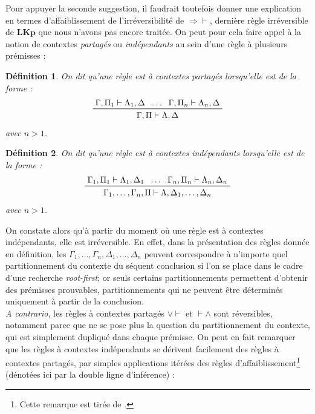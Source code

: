 \documentclass[11pt]{report}
\newcommand{\lto}{\Rightarrow}
\newcommand{\seq}{\vdash}
\newcommand{\irule}[1]{\footnotesize$#1$}
\newcommand{\iruleL}[1]{\irule{{#1}\seq}}
\newcommand{\iruleR}[1]{\irule{\seq{#1}}}
\newtheorem{definition}{Définition}
\begin{document}
Pour appuyer la seconde suggestion, il faudrait toutefois donner une explication en termes d'affaiblissement de l'irréversibilité de {\iruleL{\lto}}, dernière règle irréversible de $\mathbf{LKp}$ que nous n'avons pas encore traitée. On peut pour cela faire appel à la notion de contextes \emph{partagés} ou \emph{indépendants} au sein d'une règle à plusieurs prémisses :

\begin{definition}
    On dit qu'une règle est \emph{à contextes partagés} lorsqu'elle est de la forme :
    \begin{displaymath}
        \prftree
            {\Gamma,\Pi_1 \seq \Lambda_1,\Delta}
            {\ldots}
            {\Gamma,\Pi_n \seq \Lambda_n,\Delta}
            {\Gamma,\Pi \seq \Lambda,\Delta}
    \end{displaymath}
    avec $n > 1$.
\end{definition}

\begin{definition}
    On dit qu'une règle est \emph{à contextes indépendants} lorsqu'elle est de la forme :
    \begin{displaymath}
        \prftree
            {\Gamma_1,\Pi_1 \seq \Lambda_1,\Delta_1}
            {\ldots}
            {\Gamma_n,\Pi_n \seq \Lambda_n,\Delta_n}
            {\Gamma_1,\ldots,\Gamma_n,\Pi \seq \Lambda,\Delta_1,\ldots,\Delta_n}
    \end{displaymath}
    avec $n > 1$.
\end{definition}

On constate alors qu'à partir du moment où une règle est à contextes indépendants, elle est irréversible. En effet, dans la présentation des règles donnée en définition, les $\Gamma_1,\ldots,\Gamma_n,\Delta_1,\ldots,\Delta_n$ peuvent correspondre à n'importe quel partitionnement du contexte du séquent conclusion si l'on se place dans le cadre d'une recherche \emph{root-first}; or seuls certains partitionnements permettent d'obtenir des prémisses prouvables, partitionnements qui ne peuvent être déterminés uniquement à partir de la conclusion.\\

\emph{A contrario}, les règles à contextes partagés {\iruleL{\lor}} et {\iruleR{\land}} sont réversibles, notamment parce que ne se pose plus la question du partitionnement du contexte, qui est simplement dupliqué dans chaque prémisse. On peut en fait remarquer que les règles à contextes indépendants se dérivent facilement des règles à contextes partagés, par simples applications itérées des règles d'affaiblissement\footnote{Cette remarque est tirée de \cite{Cur05}.} (dénotées ici par la double ligne d'inférence) :
\end{document}
